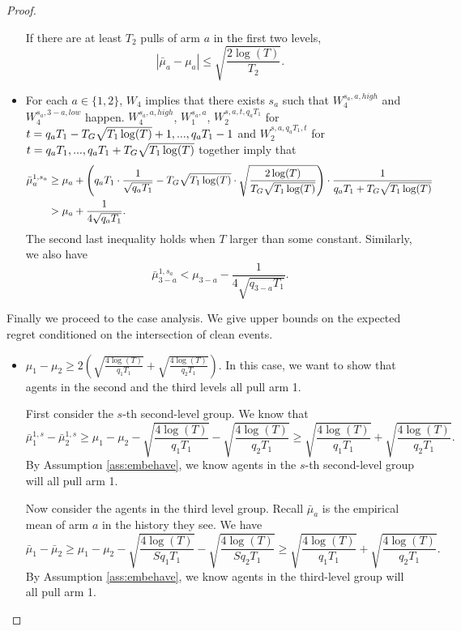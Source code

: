 \begin{proof}
\begin{itemize}
If there are at least $T_2$ pulls of arm $a$ in the first two levels, 
\[
|\bar{\mu}_a-\mu_a| \leq \sqrt{\frac{2\log(T)}{T_2}}. 
\]

\item For each $a \in \{1,2\}$, $W_4$ implies that there exists $s_a$ such that $W_4^{s_a,a,high}$ and $W_4^{s_a,3-a,low}$ happen. $W_4^{s_a,a,high}$,  $W_1^{s_a,a}$, $W_2^{s,a,t, q_aT_1}$ for $t = q_a T_1- T_G \sqrt{T_1\log(T)}+1, ...,q_aT_1-1$ and $W_2^{s,a,q_aT_1,t}$ for $t= q_aT_1,...,q_a T_1+ T_G \sqrt{T_1\log(T)}$ together imply that 
\begin{align*}
\bar{\mu}_a ^{1,s_a} &\geq \mu_a + \left(q_aT_1 \cdot \frac{1}{\sqrt{q_aT_1}} - T_G \sqrt{T_1\log(T)} \cdot \sqrt{\frac{2\log(T)}{ T_G \sqrt{T_1\log(T)}}} \right) \cdot \frac{1}{q_a T_1+ T_G \sqrt{T_1\log(T)}} \\
&> \mu_a + \frac{1}{4\sqrt{q_aT_1}}.
\end{align*}
The second last inequality holds when $T$ larger than some constant.
Similarly, we also have
\[
\bar{\mu}_{3-a} ^{1,s_a} < \mu_{3-a}   - \frac{1}{4\sqrt{q_{3-a} T_1}}.
\]
\end{itemize}

Finally we proceed to the case analysis. We give upper bounds on the expected regret conditioned on the intersection of clean events.

\begin{itemize}
\item $\mu_1 - \mu_2 \geq 2\left(\sqrt{\frac{4\log(T)}{q_1T_1}} 
+ \sqrt{\frac{4\log(T)}{q_2T_1}}\right)$. In this case, we want to show that agents in the second and the third levels all pull arm 1. 

First consider the $s$-th second-level group. We know that 
\[
\bar{\mu}_1^{1,s} - \bar{\mu}_2^{1,s} \geq \mu_1 -\mu_2 - \sqrt{\frac{4\log(T)}{q_1T_1}} - \sqrt{\frac{4\log(T)}{q_2T_1}} \geq  \sqrt{\frac{4\log(T)}{q_1T_1}} 
+ \sqrt{\frac{4\log(T)}{q_2T_1}}.
\]
By Assumption \ref{ass:embehave}, we know agents in the $s$-th second-level group will all pull arm 1.

Now consider the agents in the third level group. Recall $\bar{\mu}_a$ is the empirical mean of arm $a$ in the history they see. We have
\[
\bar{\mu}_1 - \bar{\mu}_2 \geq \mu_1 -\mu_2 - \sqrt{\frac{4\log(T)}{Sq_1T_1}} - \sqrt{\frac{4\log(T)}{Sq_2T_1}} \geq  \sqrt{\frac{4\log(T)}{q_1T_1}} 
+ \sqrt{\frac{4\log(T)}{q_2T_1}}.
\]
By Assumption \ref{ass:embehave}, we know agents in the third-level group will all pull arm 1.


\end{itemize}
\end{proof}
